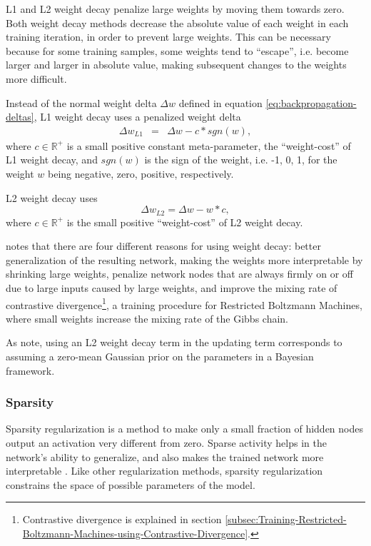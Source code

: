 L1 and L2 weight decay
penalize large weights by moving them towards zero. Both weight decay
methods decrease the absolute value of each weight in each training
iteration, in order to prevent large weights. This can be necessary
because for some training samples, some weights tend to ``escape'',
i.e. become larger and larger in absolute value, making subsequent
changes to the weights more difficult.

Instead of the normal weight delta $\Delta w$ defined in equation
\ref{eq:backpropagation-deltas}, L1 weight decay uses a penalized
weight delta 
\begin{eqnarray*}
\Delta w_{L1} & = & \Delta w-c*sgn(w),
\end{eqnarray*}
 where $c\in\mathbb{R}^{+}$ is a small positive constant meta-parameter,
the ``weight-cost'' of L1 weight decay, and $sgn(w)$ is the sign
of the weight, i.e. -1, 0, 1, for the weight $w$ being negative,
zero, positive, respectively.

L2 weight decay uses
\[
\Delta w_{L2}=\Delta w-w*c,
\]
 where $c\in\mathbb{R}^{+}$ is the small positive ``weight-cost''
of L2 weight decay.

\cite{Hinton2010} notes that there are four different reasons for
using weight decay: better generalization of the resulting network,
making the weights more interpretable by shrinking large weights,
penalize network nodes that are always firmly on or off due to large
inputs caused by large weights, and improve the mixing rate of contrastive
divergence\footnote{Contrastive divergence is explained in section \ref{subsec:Training-Restricted-Boltzmann-Machines-using-Contrastive-Divergence}.},
a training procedure for Restricted Boltzmann Machines, where small
weights increase the mixing rate of the Gibbs chain.

As \cite{FischerIgel2012} note, using an L2 weight decay term in
the updating term corresponds to assuming a zero-mean Gaussian prior
on the parameters in a Bayesian framework.

\subsubsection{Sparsity\label{subsec:Sparsity-Target}}

Sparsity regularization is a method to make only a small fraction
of hidden nodes output an activation very different from zero. Sparse
activity helps in the network's ability to generalize, and also makes
the trained network more interpretable \cite{Ng2011,Hinton2010,NairHinton2009}.
Like other regularization methods, sparsity regularization constrains
the space of possible parameters of the model.


